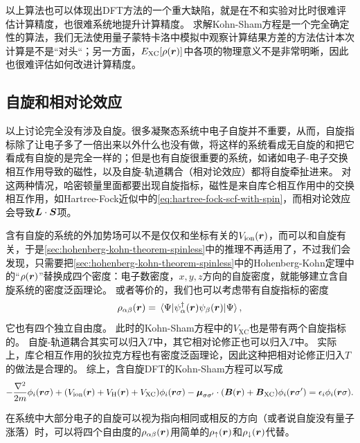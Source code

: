 以上算法也可以体现出DFT方法的一个重大缺陷，就是在不和实验对比时很难评估计算精度，也很难系统地提升计算精度。
求解Kohn-Sham方程是一个完全确定性的算法，我们无法使用量子蒙特卡洛中模拟中观察计算结果方差的方法估计本次计算是不是“对头“；另一方面，$E_\text{XC}[\rho(\vb*{r})]$中各项的物理意义不是非常明晰，因此也很难评估如何改进计算精度。

\subsection{自旋和相对论效应}

以上讨论完全没有涉及自旋。很多凝聚态系统中电子自旋并不重要，从而，自旋指标除了让电子多了一倍出来以外什么也没有做，将这样的系统看成无自旋的和把它看成有自旋的是完全一样的；但是也有自旋很重要的系统，如诸如电子-电子交换相互作用导致的磁性，以及自旋-轨道耦合（相对论效应）都将自旋牵扯进来。
对这两种情况，哈密顿量里面都要出现自旋指标，磁性是来自库仑相互作用中的交换相互作用，如Hartree-Fock近似中的\eqref{eq:hartree-fock-scf-with-spin}，而相对论效应会导致$\vb*{L} \cdot \vb*{S}$项。

含有自旋的系统的外加势场可以不是仅仅和坐标有关的$V_\text{ion}(\vb*{r})$，而可以和自旋有关，于是\autoref{sec:hohenberg-kohn-theorem-spinless}中的推理不再适用了，不过我们会发现，只需要把\autoref{sec:hohenberg-kohn-theorem-spinless}中的Hohenberg-Kohn定理中的“$\rho(\vb*{r})$”替换成四个密度：电子数密度，$x, y, z$方向的自旋密度，就能够建立含自旋系统的密度泛函理论。
或者等价的，我们也可以考虑带有自旋指标的密度
\begin{equation}
    \rho_{\alpha \beta}(\vb*{r}) = \expval{\psi^\dagger_\alpha(\vb*{r}) \psi_\beta(\vb*{r})}{\Psi},
\end{equation}
它也有四个独立自由度。
此时的Kohn-Sham方程中的$V_\text{XC}$也是带有两个自旋指标的。
自旋-轨道耦合其实可以归入$T$中，其它相对论修正也可以归入$T$中。
实际上，库仑相互作用的狄拉克方程也有密度泛函理论，因此这种把相对论修正归入$T$的做法是合理的。
综上，含自旋DFT的Kohn-Sham方程可以写成
\begin{equation}
    - \frac{\laplacian}{2m} \phi_i(\vb*{r} \sigma) + (V_\text{ion}(\vb*{r}) + V_\text{H}(\vb*{r}) + V_\text{XC}) \phi_i(\vb*{r} \sigma) - \vb*{\mu}_{\sigma \sigma'} \cdot (\vb*{B}(\vb*{r}) + \vb*{B}_\text{XC}) \phi_i(\vb*{r} \sigma') = \epsilon_i \phi_i(\vb*{r} \sigma).
\end{equation}

在系统中大部分电子的自旋可以视为指向相同或相反的方向（或者说自旋没有量子涨落）时，可以将四个自由度的$\rho_{\alpha \beta}(\vb*{r})$用简单的$\rho_\uparrow(\vb*{r})$和$\rho_\downarrow(\vb*{r})$代替。

